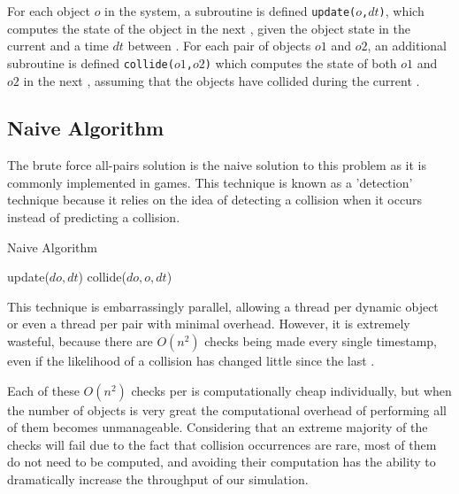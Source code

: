 \documentclass[CEJCS,PDF]{cej} %
\begin{document}
For each object $o$ in the system, a subroutine is defined \texttt{update($o$,$dt$)}, which computes the state of the object in the next , given the object state in the current  and a time $dt$ between .  For each pair of objects $o1$ and $o2$, an additional subroutine is defined \texttt{collide($o1$,$o2$)} which computes the state of both $o1$ and $o2$ in the next , assuming that the objects have collided during the current .

\subsection{Naive Algorithm}

The brute force all-pairs solution is the naive solution to this problem as it is commonly implemented in games. This technique is known as a 'detection' technique because it relies on the idea of detecting a collision when it occurs instead of predicting a collision.  

\begin{algorithm}
\caption{Naive Algorithm}
\begin{algorithmic}
		\STATE update($do,dt$)  
				\STATE collide($do, o, dt$)
			\ENDIF
		\ENDFOR
	\ENDFOR
\ENDFOR
\end{algorithmic}
\end{algorithm}

This technique is embarrassingly parallel, allowing a thread per dynamic object or even a thread per pair with minimal overhead.  However, it is extremely
wasteful, because there are $O(n^2)$ checks being made every single timestamp, even if the likelihood of a collision has changed little since the last  \cite{Seningood}.  

Each of these $O(n^2)$ checks per  is computationally cheap individually, but when the number of objects is very great the computational overhead of performing all of them becomes
unmanageable. Considering that an extreme majority of the checks will fail due to the fact that collision occurrences are rare, most of them do not need to be computed, and avoiding their computation has the ability to dramatically increase the 
throughput of our simulation.
\end{document}
